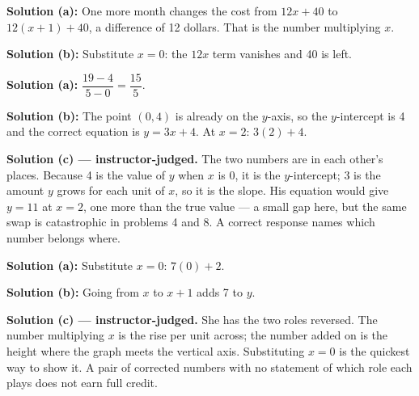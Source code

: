 \documentclass[12pt]{article}
\begin{document}




\textbf{Solution (a):} One more month changes the cost from $12x + 40$ to
$12(x + 1) + 40$, a difference of 12 dollars. That is the number multiplying
$x$. 

\textbf{Solution (b):} Substitute $x = 0$: the $12x$ term vanishes and 40 is
left. 


\textbf{Solution (a):} $\dfrac{19 - 4}{5 - 0} = \dfrac{15}{5}$. 

\textbf{Solution (b):} The point $(0, 4)$ is already on the $y$-axis, so the
$y$-intercept is 4 and the correct equation is $y = 3x + 4$. At $x = 2$:
$3(2) + 4$. 

\textbf{Solution (c) --- instructor-judged.} The two numbers are in each
other's places. Because 4 is the value of $y$ when $x$ is 0, it is the
$y$-intercept; 3 is the amount $y$ grows for each unit of $x$, so it is the
slope. His equation would give $y = 11$ at $x = 2$, one more than the true
value --- a small gap here, but the same swap is catastrophic in problems 4
and 8. A correct response names which number belongs where.


\textbf{Solution (a):} Substitute $x = 0$: $7(0) + 2$. 

\textbf{Solution (b):} Going from $x$ to $x + 1$ adds 7 to $y$. 

\textbf{Solution (c) --- instructor-judged.} She has the two roles reversed.
The number multiplying $x$ is the rise per unit across; the number added on is
the height where the graph meets the vertical axis. Substituting $x = 0$ is the
quickest way to show it. A pair of corrected numbers with no statement of which
role each plays does not earn full credit.

\end{document}
